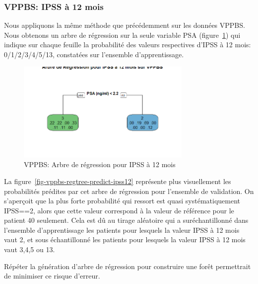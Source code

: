 %
%

%

\subsubsection{VPPBS: IPSS à 12 mois}

Nous appliquons la même méthode que précédemment sur les données VPPBS.
Nous obtenons un arbre de régression sur la seule variable PSA (figure~\ref{fig-vppbs-regtree-ipss12}) qui indique sur chaque feuille la probabilité des valeurs respectives d'IPSS à 12 mois: 0/1/2/3/4/5/13, constatées sur l'ensemble d'apprentissage.

\begin{figure}[H]
\centering
\includegraphics[width=0.75\textwidth]{../Fig/VPPBS/vppbs-regtree-ipss12.png}
\caption{VPPBS: Arbre de régression pour IPSS à 12 mois}
\label{fig-vppbs-regtree-ipss12}
\end{figure}

La figure~\ref{fig-vppbs-regtree-predict-ipss12} représente plus visuellement les probabilités prédites par cet arbre de régression pour l'ensemble de validation. On s'aperçoit que la plus forte probabilité qui ressort est quasi systématiquement
IPSS==2, alors que cette valeur correspond à la valeur de référence pour le patient 40 seulement. Cela est dû au tirage aléatoire qui a suréchantillonné dans l'ensemble d'apprentissage les patients pour lesquels la valeur IPSS à 12 mois vaut 2, et sous échantillonné les patients pour lesquels la valeur IPSS à 12 mois vaut 3,4,5 ou 13.

Répéter la génération d'arbre de régression pour construire une forêt permettrait de
minimiser ce risque d'erreur. 

